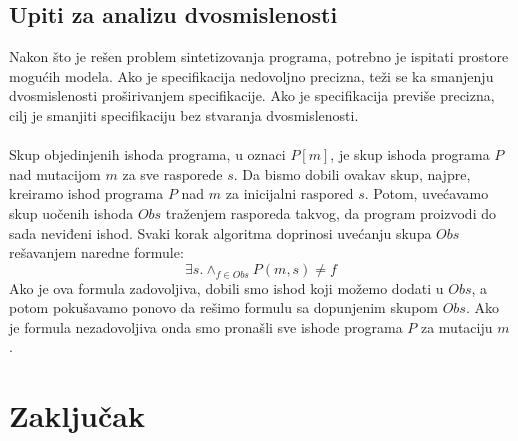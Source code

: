 \documentclass[a4paper]{article}
\begin{document}
\subsection{Upiti za analizu dvosmislenosti}
Nakon što je rešen problem sintetizovanja programa, potrebno je ispitati prostore mogućih modela. Ako je specifikacija nedovoljno precizna, teži se ka smanjenju dvosmislenosti proširivanjem specifikacije. Ako je specifikacija previše precizna, cilj je smanjiti specifikaciju bez stvaranja dvosmislenosti.\\\\

Skup objedinjenih ishoda programa, u oznaci $P[m]$, je skup ishoda programa $P$ nad mutacijom $m$ za sve rasporede $s$. Da bismo dobili ovakav skup, najpre, kreiramo ishod programa $P$ nad $m$ za inicijalni raspored $s$. Potom, uvećavamo skup uočenih ishoda $Obs$ traženjem rasporeda takvog, da program proizvodi do sada neviđeni ishod. Svaki korak algoritma doprinosi uvećanju skupa $Obs$ rešavanjem naredne formule:
\begin{equation}
\exists s. \wedge_{f \in Obs} P(m,s) \neq f
\end{equation}
Ako je ova formula zadovoljiva, dobili smo ishod koji možemo dodati u $Obs$, a potom pokušavamo ponovo da rešimo formulu sa dopunjenim skupom $Obs$. Ako je formula nezadovoljiva onda smo pronašli sve ishode programa $P$ za mutaciju $m$.

\section{Zaključak}
\label{sec:zakljucak}



\appendix
 

\end{document}
